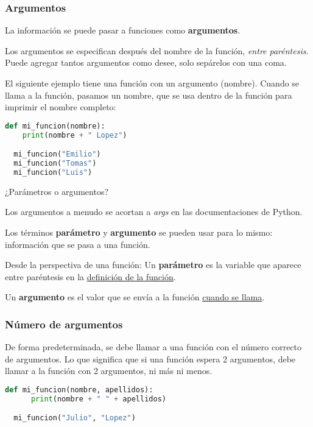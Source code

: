 \begin{frame}[fragile]
  \frametitle{Argumentos}

  \vspace{\baselineskip}
  La información se puede pasar a funciones como \textbf{argumentos}.

  \vspace{\baselineskip}
  Los argumentos se especifican después del nombre de la función,
  \emph{entre paréntesis}. Puede agregar tantos argumentos como desee,
  solo sepárelos con una coma.

  \pausa
  \vspace{\baselineskip}
  El siguiente ejemplo tiene una función con un argumento (nombre).
  Cuando se llama a la función, pasamos un nombre, que se usa
  dentro de la función para imprimir el nombre completo:

  \begin{lstlisting}[language=Python]
  def mi_funcion(nombre):
    print(nombre + " Lopez")

  mi_funcion("Emilio")
  mi_funcion("Tomas")
  mi_funcion("Luis") 
  \end{lstlisting}
\end{frame}

\begin{frame}[c]{¿Parámetros o argumentos?}

  \begin{exampleblock}{}
    Los argumentos a menudo se acortan a \emph{args} en las
    documentaciones de Python.
  \end{exampleblock} 

  \pausa
  \vspace{\baselineskip}
  Los términos \textbf{parámetro} y \textbf{argumento} se pueden
  usar para lo mismo: información que se pasa a una función.

  \pausa
  \vspace{\baselineskip}
  \begin{block}{Desde la perspectiva de una función:}
    Un \textbf{parámetro} es la variable que aparece entre paréntesis en
    la \underline{definición de la función}.

    \vspace{\baselineskip}
    Un \textbf{argumento} es el valor que se envía a la función 
    \underline{cuando se llama}.
  \end{block} 
\end{frame}

\begin{frame}[fragile]
  \frametitle{Número de argumentos}

  De forma predeterminada, se debe llamar a una función con el
  número correcto de argumentos. Lo que significa que si una
  función espera 2 argumentos, debe llamar a la función con
  2 argumentos, ni más ni menos. 

  \vspace{\baselineskip}
  \begin{lstlisting}[language=Python]
  def mi_funcion(nombre, apellidos):
      print(nombre + " " + apellidos)

  mi_funcion("Julio", "Lopez") 
  \end{lstlisting}
\end{frame}

